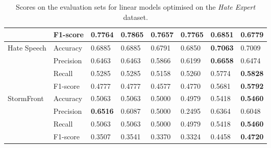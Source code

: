 \begin{table}[]
\begin{minipage}{0.42\paperheight}
{\begin{tabular}{ll|ll|ll|ll}
                                       & F1-score  & 0.7764      & \bf{0.7865}  & 0.7657      & 0.7765     & 0.6851      & 0.6779       \\ \hline  
    \multirow{4}{*}{Hate Speech}       & Accuracy  & 0.6885      & 0.6885       & 0.6791      & 0.6850     & \bf{0.7063} & 0.7009       \\  
                                       & Precision & 0.6463      & 0.6463       & 0.5866      & 0.6199     & \bf{0.6658} & 0.6474       \\  
                                       & Recall    & 0.5285      & 0.5285       & 0.5158      & 0.5260     & 0.5774      & \bf{0.5828}  \\  
                                       & F1-score  & 0.4777      & 0.4777       & 0.4577      & 0.4770     & 0.5681      & \bf{0.5792}  \\ \hline  
    \multirow{4}{*}{StormFront}        & Accuracy  & 0.5063      & 0.5063       & 0.5000      & 0.4979     & 0.5418      & \bf{0.5460}  \\  
                                       & Precision & \bf{0.6516} & 0.6087       & 0.5000      & 0.2495     & 0.6364      & 0.6048       \\  
                                       & Recall    & 0.5063      & 0.5063       & 0.5000      & 0.4979     & 0.5418      & \bf{0.5460}  \\  
                                       & F1-score  & 0.3507      & 0.3541       & 0.3370      & 0.3324     & 0.4458      & \bf{0.4720}  
    \end{tabular}%
    }      
    \caption{Scores on the evaluation sets for  linear models optimised on the \textit{Hate Expert} dataset.}  
    \label{tab:linear_hateExp_baselines}  
    \vfill  
      

\end{minipage}
\end{table}
